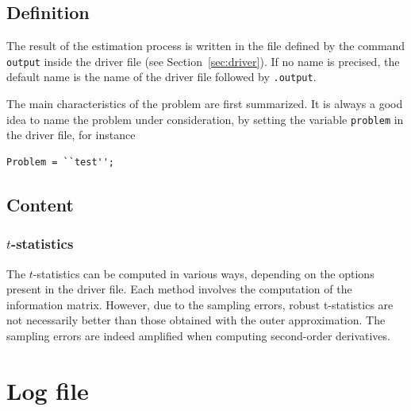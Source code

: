 \documentclass[11pt]{report}
\begin{document}
\subsection{Definition}

The result of the estimation process is written in the file defined by
the command \verb|output| inside the driver file (see
Section~\ref{sec:driver}).
If no name is precised, the default name is the name of the driver
file followed by \verb|.output|.

The main characteristics of the problem are first summarized. It is
always a good idea to name the problem under consideration, by setting
the variable \verb|problem| in the driver file, for instance
\begin{verbatim}
Problem = ``test'';
\end{verbatim}



\subsection{Content}

\subsubsection{$t$-statistics}

The $t$-statistics can be computed in various ways, depending on the
options present in the driver file.
Each method involves the computation of the information matrix.
However, due to the sampling errors, robust t-statistics are not
necessarily better than those obtained with the outer approximation.
The sampling errors are indeed amplified when computing second-order
derivatives.

\section{Log file}
\label{se:logfile}
\end{document}
